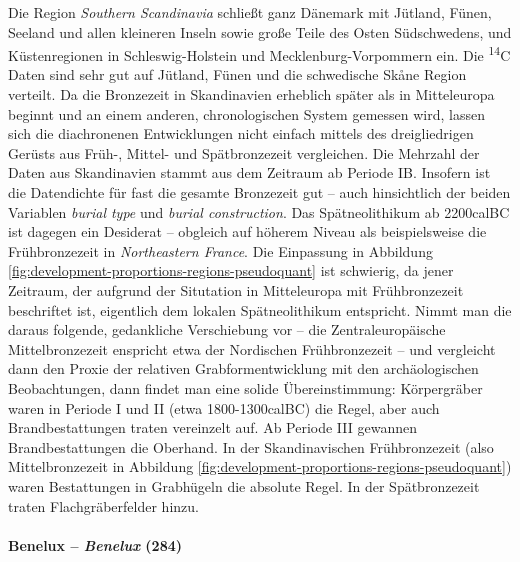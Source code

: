 \documentclass[openany,twoside,twocolumn]{book}
\begin{document}
Die Region \emph{Southern Scandinavia} schließt ganz Dänemark mit
Jütland, Fünen, Seeland und allen kleineren Inseln sowie große Teile des
Osten Südschwedens, und Küstenregionen in Schleswig-Holstein und
Mecklenburg-Vorpommern ein. Die \textsuperscript{14}C Daten sind sehr
gut auf Jütland, Fünen und die schwedische Skåne Region verteilt. Da die
Bronzezeit in Skandinavien erheblich später als in Mitteleuropa beginnt
und an einem anderen, chronologischen System gemessen wird, lassen sich
die diachronenen Entwicklungen nicht einfach mittels des dreigliedrigen
Gerüsts aus Früh-, Mittel- und Spätbronzezeit vergleichen. Die Mehrzahl
der Daten aus Skandinavien stammt aus dem Zeitraum ab Periode IB.
Insofern ist die Datendichte für fast die gesamte Bronzezeit gut -- auch
hinsichtlich der beiden Variablen \emph{burial type} und \emph{burial
construction}. Das Spätneolithikum ab 2200calBC ist dagegen ein
Desiderat -- obgleich auf höherem Niveau als beispielsweise die
Frühbronzezeit in \emph{Northeastern France}. Die Einpassung in
Abbildung \ref{fig:development-proportions-regions-pseudoquant} ist
schwierig, da jener Zeitraum, der aufgrund der Situtation in
Mitteleuropa mit Frühbronzezeit beschriftet ist, eigentlich dem lokalen
Spätneolithikum entspricht. Nimmt man die daraus folgende, gedankliche
Verschiebung vor -- die Zentraleuropäische Mittelbronzezeit enspricht
etwa der Nordischen Frühbronzezeit -- und vergleicht dann den Proxie der
relativen Grabformentwicklung mit den archäologischen Beobachtungen,
dann findet man eine solide Übereinstimmung: Körpergräber waren in
Periode I und II (etwa 1800-1300calBC) die Regel, aber auch
Brandbestattungen traten vereinzelt auf. Ab Periode III gewannen
Brandbestattungen die Oberhand. In der Skandinavischen Frühbronzezeit
(also Mittelbronzezeit in Abbildung
\ref{fig:development-proportions-regions-pseudoquant}) waren
Bestattungen in Grabhügeln die absolute Regel. In der Spätbronzezeit
traten Flachgräberfelder hinzu.

\hypertarget{benelux-benelux-284}{%
\paragraph{\texorpdfstring{Benelux -- \emph{Benelux}
(284)}{Benelux -- Benelux (284)}}\label{benelux-benelux-284}}
\end{document}

